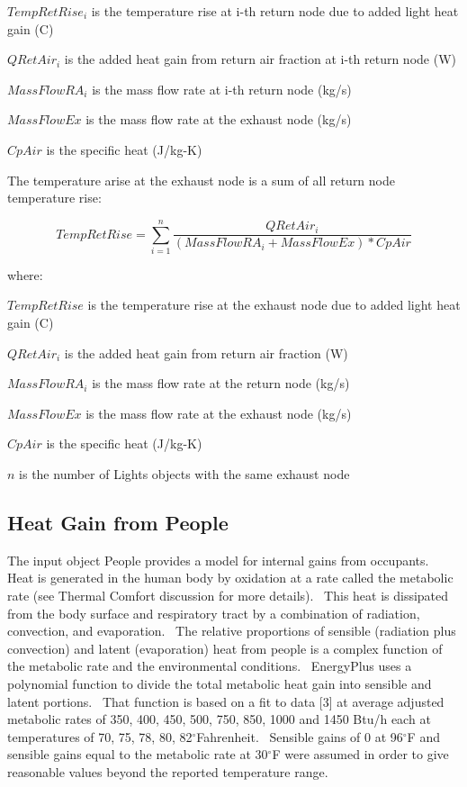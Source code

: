 \(TempRetRise_i\) is the temperature rise at i-th return node due to added light heat gain (C)

\(QRetAir_i\) is the added heat gain from return air fraction at i-th return node (W)

\(MassFlowRA_i\) is the mass flow rate at i-th return node (kg/s)

\(MassFlowEx\) is the mass flow rate at the exhaust node (kg/s)

\(CpAir\) is the specific heat (J/kg-K)

The temperature arise at the exhaust node is a sum of all return node temperature rise:

\begin{equation}
TempRetRise = {\sum_{i=1} ^n}\frac{ QRetAir_i} {(MassFlowRA_i + MassFlowEx ) * CpAir}
\end{equation}

where:

\(TempRetRise\) is the temperature rise at the exhaust node due to added light heat gain (C)

\(QRetAir_i\) is the added heat gain from return air fraction (W)

\(MassFlowRA_i\) is the mass flow rate at the return node (kg/s)

\(MassFlowEx\) is the mass flow rate at the exhaust node (kg/s)

\(CpAir\) is the specific heat (J/kg-K)

\(n\) is the number of Lights objects with the same exhaust node


\subsection{Heat Gain from People}\label{heat-gain-from-people-000}

The input object People provides a model for internal gains from occupants.~ Heat is generated in the human body by oxidation at a rate called the metabolic rate (see Thermal Comfort discussion for more details).~ This heat is dissipated from the body surface and respiratory tract by a combination of radiation, convection, and evaporation.~ The relative proportions of sensible (radiation plus convection) and latent (evaporation) heat from people is a complex function of the metabolic rate and the environmental conditions.~ EnergyPlus uses a polynomial function to divide the total metabolic heat gain into sensible and latent portions.~ That function is based on a fit to data {[}3{]} at average adjusted metabolic rates of 350, 400, 450, 500, 750, 850, 1000 and 1450 Btu/h each at temperatures of 70, 75, 78, 80, 82\(^{\circ}\)Fahrenheit.~ Sensible gains of 0 at 96\(^{\circ}\)F and sensible gains equal to the metabolic rate at 30\(^{\circ}\)F were assumed in order to give reasonable values beyond the reported temperature range.

